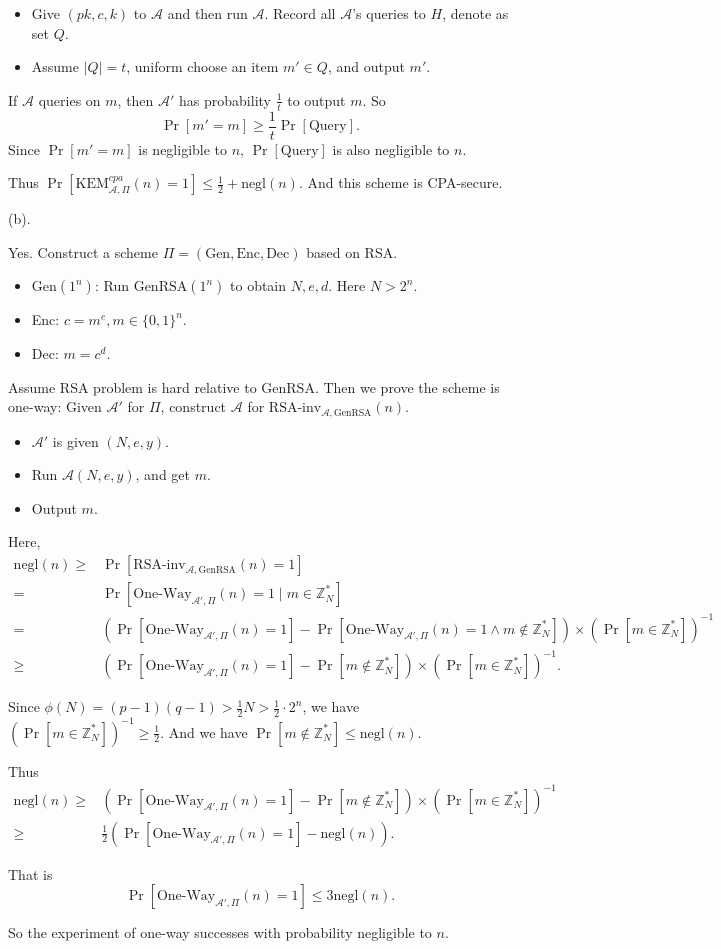 \documentclass[a4paper]{article}
\newcommand{\negl}{\text{negl}}
\newcommand{\Enc}{\text{Enc}}
\newcommand{\GenRSA}{\text{GenRSA}}
\newcommand{\Dec}{\text{Dec}}
\newcommand{\Gen}{\text{Gen}}
\newcommand{\Query}{\text{Query}}
\newcommand{\KEM}{\text{KEM}}
\newcommand{\Z}{\mathbb{Z}}
\newcommand{\A}{\mathcal{A}}
\newenvironment{problem}[2][Problem]{\begin{trivlist}
\item[\hskip \labelsep {\bfseries #1}\hskip \labelsep {\bfseries #2.}]}{\end{trivlist}}
\begin{document}
\begin{problem}{11.3}
\begin{itemize}
    \item Give $(pk,c,k)$ to $\A$ and then run $\A$. Record all $\A$'s queries to $H$, denote as set $Q$.
    \item Assume $|Q|=t$, uniform choose an item $m'\in Q$, and output $m'$.
\end{itemize}
If $\A$ queries on $m$, then $\A'$ has probability $\frac1t$ to output $m$. 
So $$\Pr[m'=m]\ge \frac1t\Pr[\Query].$$
Since $\Pr[m'=m]$ is negligible to $n$, $\Pr[\Query]$ is also negligible to $n$.\par
Thus $\Pr[\KEM_{\A,\Pi}^{cpa}(n)=1]\le\frac12+\negl(n)$. And this scheme is CPA-secure.\par\vspace{2ex}
(b).\par
Yes. Construct a scheme $\Pi=(\Gen,\Enc,\Dec)$ based on RSA. 
\begin{itemize}
    \item $\Gen(1^n)$: Run $\GenRSA(1^n)$ to obtain $N,e,d$. Here $N>2^n$.
    \item Enc: $c=m^e,m\in\{0,1\}^n$.
    \item Dec: $m=c^d$.
\end{itemize}\par
Assume RSA problem is hard relative to $\GenRSA$. Then we prove the scheme is one-way: Given $\A'$ for $\Pi$, construct $\A$ for $\text{RSA-inv}_{\A,\GenRSA}(n)$.\par
\begin{itemize}
    \item $\A'$ is given $(N,e,y)$.
    \item Run $\A(N,e,y)$, and get $m$.
    \item Output $m$.
\end{itemize}\par
Here,
\begin{align*}
    \negl(n)\ge&\Pr[\text{RSA-inv}_{\A,\GenRSA}(n)=1]\\
    =&\Pr[\text{One-Way}_{\A',\Pi}(n)=1\mid m\in\Z_N^*]\\
    =&(\Pr[\text{One-Way}_{\A',\Pi}(n)=1]-\Pr[\text{One-Way}_{\A',\Pi}(n)=1\land m\not\in\Z_N^*])\times(\Pr[m\in \Z_N^*])^{-1}\\
    \ge&(\Pr[\text{One-Way}_{\A',\Pi}(n)=1]-\Pr[m\not\in\Z_N^*])\times(\Pr[m\in \Z_N^*])^{-1}.
\end{align*}\par
Since $\phi(N)=(p-1)(q-1)>\frac12N>\frac12\cdot 2^n$, we have $(\Pr[m\in \Z_N^*])^{-1}\ge\frac12$. And we have $\Pr[m\not\in \Z_N^*]\le\negl(n)$.\par
Thus 
\begin{align*}
    \negl(n)\ge&(\Pr[\text{One-Way}_{\A',\Pi}(n)=1]-\Pr[m\not\in\Z_N^*])\times(\Pr[m\in \Z_N^*])^{-1}\\
    \ge& \frac12(\Pr[\text{One-Way}_{\A',\Pi}(n)=1]-\negl(n)).
\end{align*}\par
That is $$\Pr[\text{One-Way}_{\A',\Pi}(n)=1]\le3\negl(n).$$\par
So the experiment of one-way successes with probability negligible to $n$.
\end{problem}
\end{document}
